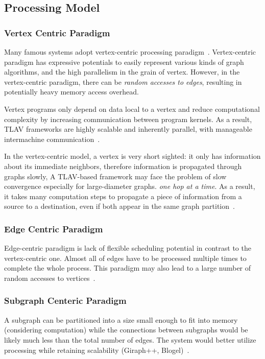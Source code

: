 \documentclass[UTF8,12pt,a4paper]{article}
\begin{document}
\subsection{Processing Model}
\subsubsection{Vertex Centric Paradigm}
Many famous systems adopt
vertex-centric processing paradigm~\cite{DBLP:journals/csur/McCuneWM15}.
Vertex-centric paradigm has expressive potentials
to easily represent various kinds of graph algorithms,
and the high parallelism in the grain of vertex.
However, in the vertex-centric paradigm,
there can be \textit{random accesses to edges},
resulting in potentially heavy memory access overhead.

Vertex programs only depend on data local to a vertex
and reduce computational complexity by increasing communication between program kernels.
As a result, TLAV frameworks are highly scalable and inherently parallel,
with manageable intermachine communication~\cite{DBLP:journals/csur/McCuneWM15}.

In the vertex-centric model, a vertex is very short sighted:
it only has information about its immediate neighbors,
therefore information is propagated through graphs slowly,
A TLAV-based framework may face the problem of slow convergence 
especially for large-diameter graphs.
\textit{one hop at a time}.
As a result, it takes many computation steps
to propagate a piece of information from a source to a destination,
even if both appear in the same graph partition~\cite{DBLP:journals/csur/HeidariSCB18}.
\subsubsection{Edge Centric Paradigm}
Edge-centric paradigm is lack of flexible scheduling potential
in contrast to the vertex-centric one.
Almost all of edges have to be processed multiple times
to complete the whole process.
This paradigm may also lead to
a large number of random accesses to vertices~\cite{DBLP:conf/usenix/MalicevicLZ17}.
\subsubsection{Subgraph Centeric Paradigm}
A subgraph can be partitioned into a size small enough to fit into memory
(considering computation) while the connections between subgraphs would be likely
much less than the total number of edges.
The system would better utilize processing while retaining scalability
(Giraph++, Blogel)~\cite{DBLP:journals/csur/McCuneWM15}.
\end{document}
